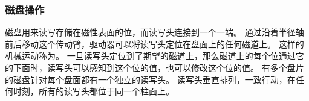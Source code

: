 {{        \subsubsection{磁盘操作}
        {
            磁盘用来读写存储在磁性表面的位，而读写头连接到一个一端。
            通过沿着半径轴前后移动这个传动臂，驱动器可以将读写头定位在盘面上的任何磁道上。
            这样的机械运动称为。
            一旦读写头定位到了期望的磁道上，那么磁道上的每个位通过它的下面时，读写头可以感知到这个位的值，也可以修改这个位的值。
            有多个盘片的磁盘针对每个盘面都有一个独立的读写头。
            读写头垂直排列，一致行动，在任何时刻，所有的读写头都位于同一个柱面上。
        }
    }
}
